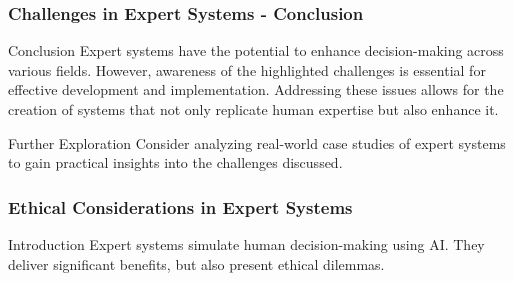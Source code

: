 \documentclass[aspectratio=169]{beamer}
\begin{document}
\begin{frame}[fragile]
    \frametitle{Challenges in Expert Systems - Conclusion}
    \begin{block}{Conclusion}
        Expert systems have the potential to enhance decision-making across various fields. However, awareness of the highlighted challenges is essential for effective development and implementation. Addressing these issues allows for the creation of systems that not only replicate human expertise but also enhance it.
    \end{block}
    
    \begin{block}{Further Exploration}
        Consider analyzing real-world case studies of expert systems to gain practical insights into the challenges discussed.
    \end{block}
\end{frame}

\begin{frame}[fragile]
    \frametitle{Ethical Considerations in Expert Systems}
    \begin{block}{Introduction}
        Expert systems simulate human decision-making using AI. They deliver significant benefits, but also present ethical dilemmas.
    \end{block}
\end{frame}
\end{document}
